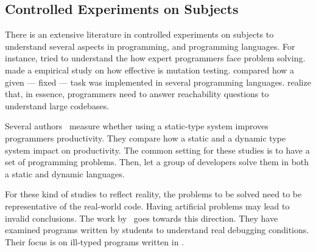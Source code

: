 \subsection*{Controlled Experiments on Subjects }
There is an extensive literature \perse{} in controlled experiments on subjects to understand several aspects in programming, and programming languages.
For instance, \cite{solowayEmpiricalStudiesProgramming1984} tried to understand the how expert programmers face problem solving.
\cite{buddTheoreticalEmpiricalStudies1980} made a empirical study on how effective is mutation testing.
\cite{precheltEmpiricalComparisonSeven2000} compared how a given --- fixed --- task was implemented in several programming languages.
%
\cite{latozaDevelopersAskReachability2010} realize that, in essence, programmers need to answer reachability questions to understand large codebases.

Several authors~\cite{stuchlikStaticVsDynamic2011,mayerEmpiricalStudyInfluence2012,harlinImpactUsingStaticType2017} measure whether using a static-type system improves programmers productivity.
They compare how a static and a dynamic type system impact on productivity.
The common setting for these studies is to have a set of programming problems.
Then, let a group of developers solve them in both a static and dynamic languages.

For these kind of studies to reflect reality, the problems to be solved need to be representative of the real-world code.
Having artificial problems may lead to invalid conclusions.
The work by~\cite{wuHowTypeErrors2017,wuLearningUserFriendly2017} goes towards this direction. 
They have examined programs written by students to understand real debugging conditions. 
Their focus is on ill-typed programs written in \haskell{}.

